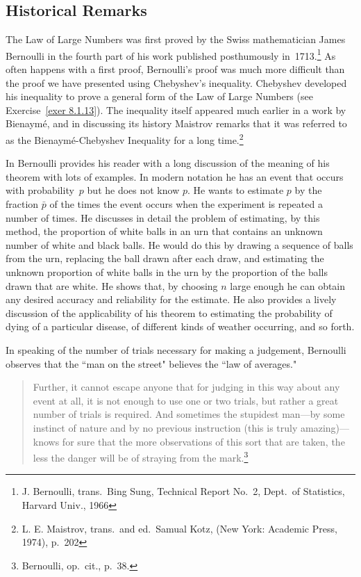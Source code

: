 \subsection*{Historical Remarks}
The Law of Large Numbers was first proved by the Swiss mathematician James
Bernoulli in the fourth part of his work  published
posthumously in~1713.\footnote{J. Bernoulli,  trans.~Bing Sung, Technical Report No.~2, Dept.\ of Statistics, Harvard
Univ., 1966}  As often happens with a first proof, Bernoulli's proof was much
more difficult than the proof we have presented using Chebyshev's inequality. 
Chebyshev developed his inequality to prove a general form of the Law of Large
Numbers (see Exercise~\ref{exer 8.1.13}).  The inequality itself appeared
much earlier in a work by Bienaym\'e, and in discussing its history
Maistrov remarks that it was referred to as the Bienaym\'e-Chebyshev
Inequality for a long time.\footnote{L. E. Maistrov,  trans.\ and ed.~Samual Kotz, (New York: Academic Press, 1974),
p.~202}

In  Bernoulli provides his reader with a long discussion
of the meaning of his theorem with lots of examples.  In modern notation he has
an event that occurs with probability~$p$ but he does not know $p$.  He wants
to estimate $p$ by the fraction $\bar{p}$ of the times the event occurs
when the experiment is repeated a number of times.  He discusses in detail the
problem of estimating, by this method, the proportion of white balls in an urn
that contains an unknown number of white and black balls.  He would do this by
drawing a sequence of balls from the urn, replacing the ball drawn after each
draw, and estimating the unknown proportion of white balls in the urn by the
proportion of the balls drawn that are white.  He shows that, by choosing $n$
large enough he can obtain any desired accuracy and reliability for the
estimate.  He also provides a lively discussion of the applicability of his
theorem to estimating the probability of dying of a particular disease, of
different kinds of weather occurring, and so forth.

In speaking of the number of trials necessary for making a judgement, Bernoulli
observes that the ``man on the street" believes the ``law of averages."

\begin{quote}
Further, it cannot escape anyone that for judging in this way about any event
at all, it is not enough to use one or two trials, but rather a great number of
trials is required.  And sometimes the stupidest man---by some instinct of
nature  and by no previous instruction (this is truly amazing)---
knows for sure that the more observations of this sort that are taken, the less
the danger will be of straying from the mark.\footnote{Bernoulli, op.\ cit., p.~38.}
\end{quote}


